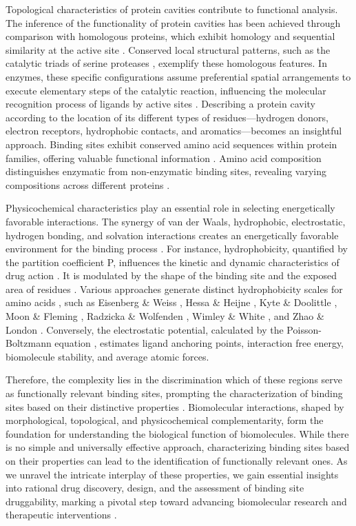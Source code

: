\documentclass[Ingles]{phdthesis}
\begin{document}
Topological characteristics of protein cavities contribute to functional analysis. The inference of the functionality of protein cavities has been achieved through comparison with homologous proteins, which exhibit homology and sequential similarity at the active site \cite{juncker2009}. Conserved local structural patterns, such as the catalytic triads of serine proteases \cite{dodson1998}, exemplify these homologous features. In enzymes, these specific configurations assume preferential spatial arrangements to execute elementary steps of the catalytic reaction, influencing the molecular recognition process of ligands by active sites \cite{sotriffer2002,henrich2010,thornton2000}. Describing a protein cavity according to the location of its different types of residues---hydrogen donors, electron receptors, hydrophobic contacts, and aromatics---becomes an insightful approach. Binding sites exhibit conserved amino acid sequences within protein families, offering valuable functional information \cite{henrich2010}. Amino acid composition distinguishes enzymatic from non-enzymatic binding sites, revealing varying compositions across different proteins \cite{guerra2019,carlson2008}.

Physicochemical characteristics play an essential role in selecting energetically favorable interactions. The synergy of van der Waals, hydrophobic, electrostatic, hydrogen bonding, and solvation interactions creates an energetically favorable environment for the binding process \cite{henrich2010}. For instance, hydrophobicity, quantified by the partition coefficient P, influences the kinetic and dynamic characteristics of drug action \cite{mannhold2009}. It is modulated by the shape of the binding site and the exposed area of residues \cite{henrich2010}. Various approaches generate distinct hydrophobicity scales for amino acids \cite{heiden1993}, such as Eisenberg \& Weiss \cite{eisenberg1984}, Hessa \& Heijne \cite{hessa2005}, Kyte \& Doolittle \cite{kyte1982}, Moon \& Fleming \cite{moon2011}, Radzicka \& Wolfenden \cite{radzicka1988}, Wimley \& White \cite{wimley1996}, and Zhao \& London \cite{zhao2006}. Conversely, the electrostatic potential, calculated by the Poisson-Boltzmann equation \cite{honig1995}, estimates ligand anchoring points, interaction free energy, biomolecule stability, and average atomic forces.

Therefore, the complexity lies in the discrimination which of these regions serve as functionally relevant binding sites, prompting the characterization of binding sites based on their distinctive properties \cite{sotriffer2002,henrich2010,liang1998,guerra2019}. Biomolecular interactions, shaped by morphological, topological, and physicochemical complementarity, form the foundation for understanding the biological function of biomolecules. While there is no simple and universally effective approach, characterizing binding sites based on their properties can lead to the identification of functionally relevant ones. As we unravel the intricate interplay of these properties, we gain essential insights into rational drug discovery, design, and the assessment of binding site druggability, marking a pivotal step toward advancing biomolecular research and therapeutic interventions \cite{sotriffer2002,henrich2010}.
\end{document}
